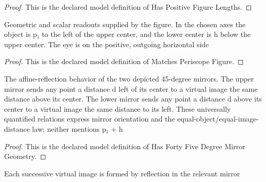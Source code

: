 \begin{proof}
  This is the declared model definition of Has Positive Figure Lengths.
\end{proof}
\begin{definition}
  \label{def:physics:phyx-mini-0026:phyxminiproblems-problemphyxmini0026-matchesperiscopefigure}
  Geometric and scalar readouts supplied by the figure. In the chosen axes the object is p₁ to the left of the upper center, and the lower center is h below the upper center. The eye is on the positive, outgoing horizontal side
\end{definition}
\begin{proof}
  This is the declared model definition of Matches Periscope Figure.
\end{proof}
\begin{definition}
  \label{def:physics:phyx-mini-0026:phyxminiproblems-problemphyxmini0026-hasfortyfivedegreemirrorgeometry}
  The affine-reflection behavior of the two depicted 45-degree mirrors. The upper mirror sends any point a distance d left of its center to a virtual image the same distance above its center. The lower mirror sends any point a distance d above its center to a virtual image the same distance to its left. These universally quantified relations express mirror orientation and the equal-object/equal-image-distance law; neither mentions p₁ + h
\end{definition}
\begin{proof}
  This is the declared model definition of Has Forty Five Degree Mirror Geometry.
\end{proof}
\begin{definition}
  \label{def:physics:phyx-mini-0026:phyxminiproblems-problemphyxmini0026-satisfiesplanemirrorimageformation}
  Each successive virtual image is formed by reflection in the relevant mirror
\end{definition}
